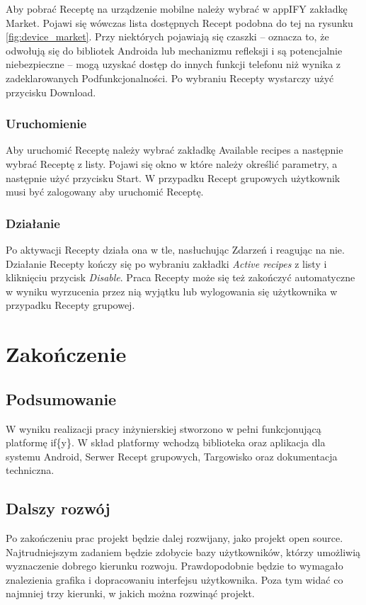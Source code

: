 \documentclass[11pt,a4paper,polish,thesis]{dcsbook}
\begin{document}
Aby pobrać Receptę na urządzenie mobilne należy wybrać w appIFY zakładkę Market. Pojawi się wówczas lista dostępnych Recept podobna do tej na rysunku
\ref{fig:device_market}. Przy niektórych pojawiają się czaszki -- oznacza to, że odwołują się do bibliotek Androida lub mechanizmu refleksji i są potencjalnie
niebezpieczne -- mogą uzyskać dostęp do innych funkcji telefonu niż wynika z zadeklarowanych Podfunkcjonalności. Po wybraniu Recepty wystarczy użyć przycisku Download.
\subsection{Uruchomienie}
Aby uruchomić Receptę należy wybrać zakładkę Available recipes a następnie wybrać Receptę z listy. Pojawi się okno w które należy określić parametry, a następnie użyć przycisku Start. W przypadku Recept grupowych użytkownik musi być zalogowany aby uruchomić Receptę.
\subsection{Działanie}
Po aktywacji Recepty działa ona w tle, nasłuchując Zdarzeń i reagując na nie. Działanie Recepty kończy się po wybraniu zakładki \emph{Active recipes} z listy i
kliknięciu przycisk \emph{Disable}. Praca Recepty może się też zakończyć automatyczne w wyniku wyrzucenia przez nią wyjątku lub wylogowania się użytkownika w
przypadku Recepty grupowej.

\chapter{Zakończenie}
\section{Podsumowanie}
W wyniku realizacji pracy inżynierskiej stworzono w pełni funkcjonującą platformę if\{y\}. W skład platformy wchodzą biblioteka oraz aplikacja dla systemu Android,
Serwer Recept grupowych, Targowisko oraz dokumentacja techniczna.
\section{Dalszy rozwój}
Po zakończeniu prac projekt będzie dalej rozwijany, jako projekt open source. Najtrudniejszym zadaniem będzie zdobycie bazy użytkowników, którzy umożliwią wyznaczenie dobrego kierunku rozwoju. Prawdopodobnie będzie to wymagało znalezienia grafika i dopracowaniu interfejsu użytkownika. Poza tym widać co najmniej trzy kierunki, w jakich można rozwinąć projekt.
\end{document}
